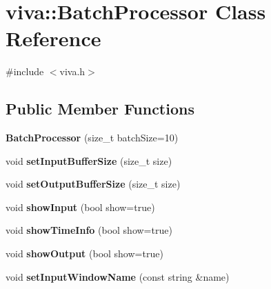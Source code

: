 \hypertarget{classviva_1_1_batch_processor}{}\section{viva\+:\+:Batch\+Processor Class Reference}
\label{classviva_1_1_batch_processor}


{\ttfamily \#include $<$viva.\+h$>$}

\subsection*{Public Member Functions}
\begin{DoxyCompactItemize}
\item 
{\bfseries Batch\+Processor} (size\+\_\+t batch\+Size=10)\hypertarget{classviva_1_1_batch_processor_a7e309a7a5ecc53a8253d254672c400d8}{}\label{classviva_1_1_batch_processor_a7e309a7a5ecc53a8253d254672c400d8}

\item 
void {\bfseries set\+Input\+Buffer\+Size} (size\+\_\+t size)\hypertarget{classviva_1_1_batch_processor_a5e2b26da5706c542bacecace7e4ce0fd}{}\label{classviva_1_1_batch_processor_a5e2b26da5706c542bacecace7e4ce0fd}

\item 
void {\bfseries set\+Output\+Buffer\+Size} (size\+\_\+t size)\hypertarget{classviva_1_1_batch_processor_aa8edb1215104aee1634f8708a5abb6f3}{}\label{classviva_1_1_batch_processor_aa8edb1215104aee1634f8708a5abb6f3}

\item 
void {\bfseries show\+Input} (bool show=true)\hypertarget{classviva_1_1_batch_processor_a1b176817a4c76a6bb5a997ad95e28e25}{}\label{classviva_1_1_batch_processor_a1b176817a4c76a6bb5a997ad95e28e25}

\item 
void {\bfseries show\+Time\+Info} (bool show=true)\hypertarget{classviva_1_1_batch_processor_a904eb42e4d6c33a1734899c95afa4e8e}{}\label{classviva_1_1_batch_processor_a904eb42e4d6c33a1734899c95afa4e8e}

\item 
void {\bfseries show\+Output} (bool show=true)\hypertarget{classviva_1_1_batch_processor_a28ecd4aa1143ec102a615c2a55766fbf}{}\label{classviva_1_1_batch_processor_a28ecd4aa1143ec102a615c2a55766fbf}

\item 
void {\bfseries set\+Input\+Window\+Name} (const string \&name)\hypertarget{classviva_1_1_batch_processor_adb01a29577ddc3016be06bd11debaa71}{}\label{classviva_1_1_batch_processor_adb01a29577ddc3016be06bd11debaa71}


\end{DoxyCompactItemize}
